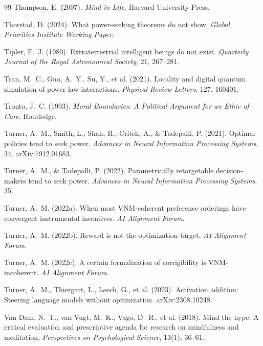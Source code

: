 \documentclass[11pt,twocolumn]{article}
\begin{document}
\begin{thebibliography}{99}
 Thompson, E. (2007). \emph{Mind in Life}. Harvard University Press.

 Thorstad, D. (2024). What power-seeking theorems do not show. \emph{Global Priorities Institute Working Paper}.

 Tipler, F.~J. (1980). Extraterrestrial intelligent beings do not exist. \emph{Quarterly Journal of the Royal Astronomical Society}, 21, 267--281.

 Tran, M.~C., Guo, A.~Y., Su, Y., et al. (2021). Locality and digital quantum simulation of power-law interactions. \emph{Physical Review Letters}, 127, 160401.

 Tronto, J.~C. (1993). \emph{Moral Boundaries: A Political Argument for an Ethic of Care}. Routledge.

 Turner, A.~M., Smith, L., Shah, R., Critch, A., \& Tadepalli, P. (2021). Optimal policies tend to seek power. \emph{Advances in Neural Information Processing Systems}, 34. arXiv:1912.01683.

 Turner, A.~M., \& Tadepalli, P. (2022). Parametrically retargetable decision-makers tend to seek power. \emph{Advances in Neural Information Processing Systems}, 35.

 Turner, A.~M. (2022a). When most VNM-coherent preference orderings have convergent instrumental incentives. \emph{AI Alignment Forum}.

 Turner, A.~M. (2022b). Reward is not the optimization target. \emph{AI Alignment Forum}.

 Turner, A.~M. (2022c). A certain formalization of corrigibility is VNM-incoherent. \emph{AI Alignment Forum}.

 Turner, A.~M., Thiergart, L., Leech, G., et al. (2023). Activation addition: Steering language models without optimization. arXiv:2308.10248.

 Van Dam, N.~T., van Vugt, M.~K., Vago, D.~R., et al. (2018). Mind the hype: A critical evaluation and prescriptive agenda for research on mindfulness and meditation. \emph{Perspectives on Psychological Science}, 13(1), 36--61.


\end{thebibliography}
\end{document}
